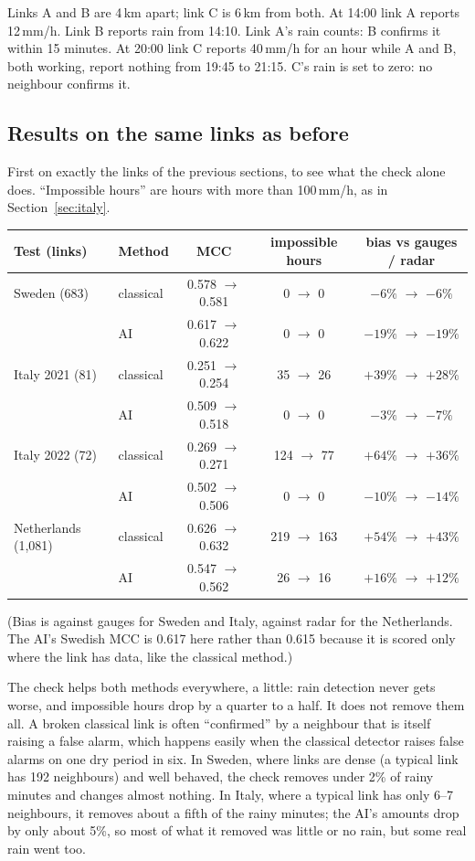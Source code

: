 \begin{example}
Links A and B are 4\,km apart; link C is 6\,km from both. At 14:00 link A reports 12\,mm/h. Link B reports rain from 14:10.
Link A's rain counts: B confirms it within 15 minutes. At 20:00 link C reports 40\,mm/h for an hour while A and B, both
working, report nothing from 19:45 to 21:15. C's rain is set to zero: no neighbour confirms it.
\end{example}

\subsection{Results on the same links as before}
First on exactly the links of the previous sections, to see what the check alone does. ``Impossible hours'' are hours with
more than 100\,mm/h, as in Section~\ref{sec:italy}.
\begin{center}\footnotesize
\begin{tabular}{llccc}
\toprule
Test (links) & Method & MCC & impossible hours & bias vs gauges / radar\\
\midrule
Sweden (683) & classical & 0.578 $\to$ 0.581 & 0 $\to$ 0 & $-6\%$ $\to$ $-6\%$\\
             & AI        & 0.617 $\to$ 0.622 & 0 $\to$ 0 & $-19\%$ $\to$ $-19\%$\\
Italy 2021 (81) & classical & 0.251 $\to$ 0.254 & 35 $\to$ 26 & $+39\%$ $\to$ $+28\%$\\
                & AI        & 0.509 $\to$ 0.518 & 0 $\to$ 0 & $-3\%$ $\to$ $-7\%$\\
Italy 2022 (72) & classical & 0.269 $\to$ 0.271 & 124 $\to$ 77 & $+64\%$ $\to$ $+36\%$\\
                & AI        & 0.502 $\to$ 0.506 & 0 $\to$ 0 & $-10\%$ $\to$ $-14\%$\\
Netherlands (1{,}081) & classical & 0.626 $\to$ 0.632 & 219 $\to$ 163 & $+54\%$ $\to$ $+43\%$\\
                      & AI        & 0.547 $\to$ 0.562 & 26 $\to$ 16 & $+16\%$ $\to$ $+12\%$\\
\bottomrule
\end{tabular}
\end{center}
(Bias is against gauges for Sweden and Italy, against radar for the Netherlands. The AI's Swedish MCC is 0.617 here rather
than 0.615 because it is scored only where the link has data, like the classical method.)

The check helps both methods everywhere, a little: rain detection never gets worse, and impossible hours drop by a quarter
to a half. It does not remove them all. A broken classical link is often ``confirmed'' by a neighbour that is itself
raising a false alarm, which happens easily when the classical detector raises false alarms on one dry period in six. In
Sweden, where links are dense (a typical link has 192 neighbours) and well behaved, the check removes under 2\% of rainy
minutes and changes almost nothing. In Italy, where a typical link has only 6--7 neighbours, it removes about a fifth of the
rainy minutes; the AI's amounts drop by only about 5\%, so most of what it removed was little or no rain, but some real rain
went too.

